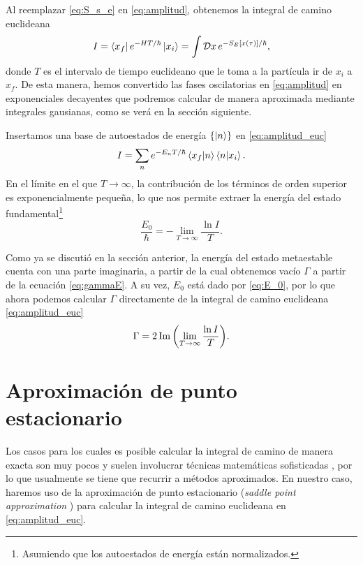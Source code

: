Al reemplazar \eqref{eq:S_s_e} en \eqref{eq:amplitud}, obtenemos la integral de camino euclideana \cite{das2006field}
\begin{equation}\label{eq:amplitud_euc}
I = \bra{x_f}e^{-HT/\hbar}\ket{x_i} = \int \mathcal{D}x \, e^{-S_E\qty[x\qty(\tau)]/\hbar},
\end{equation}
donde $T$ es el intervalo de tiempo euclideano que le toma a la partícula ir de $x_i$ a $x_f$. De esta manera, hemos convertido las fases oscilatorias en \eqref{eq:amplitud} en exponenciales decayentes que podremos calcular de manera aproximada mediante integrales gausianas, como se verá en la sección siguiente.

Insertamos una base de autoestados de energía $\qty{\ket{n}}$ en \eqref{eq:amplitud_euc} \cite{coleman1977fate}
\begin{equation}\label{eq:Eeigen}
I = \sum_n e^{-E_n T/\hbar} \bra{x_f}\ket{n}\bra{n}\ket{x_i}.
\end{equation}
En el límite en el que $T \rightarrow \infty$, 
la contribución de los términos de orden superior es exponencialmente pequeña, lo que nos permite extraer la energía del estado fundamental\footnote{Asumiendo que los autoestados de energía están normalizados.} \cite{andreassen2017precision}
\begin{equation} \label{eq:E_0}
	\frac{E_0}{\hbar} = -\lim_{T \rightarrow \infty} \frac{ \ln I}{T}.
\end{equation}

Como ya se discutió en la sección anterior,  %
la energía del estado metaestable cuenta con una parte imaginaria, a partir de la cual obtenemos vacío $\Gamma$ a partir de la ecuación \eqref{eq:gammaE}. A su vez, $E_0$ está dado por \eqref{eq:E_0}, por lo que ahora podemos calcular $\Gamma$ directamente de la integral de camino euclideana \eqref{eq:amplitud_euc}
\begin{equation} \label{eq:Gamma}
	\Gamma = 2\Im\qty(\lim_{T \rightarrow \infty} \frac{ \ln I}{T}).
\end{equation}

\section{Aproximación de punto estacionario}

Los casos para los cuales es posible calcular la integral de camino de manera exacta son muy pocos y suelen involucrar técnicas matemáticas sofisticadas \cite{feynman2010quantum, das2006field, kleinert2009path}, por lo que usualmente se tiene que recurrir a métodos aproximados. En nuestro caso, haremos uso de la aproximación de punto estacionario (\emph{saddle point approximation} 
) para calcular la integral de camino euclideana en \eqref{eq:amplitud_euc}. 

